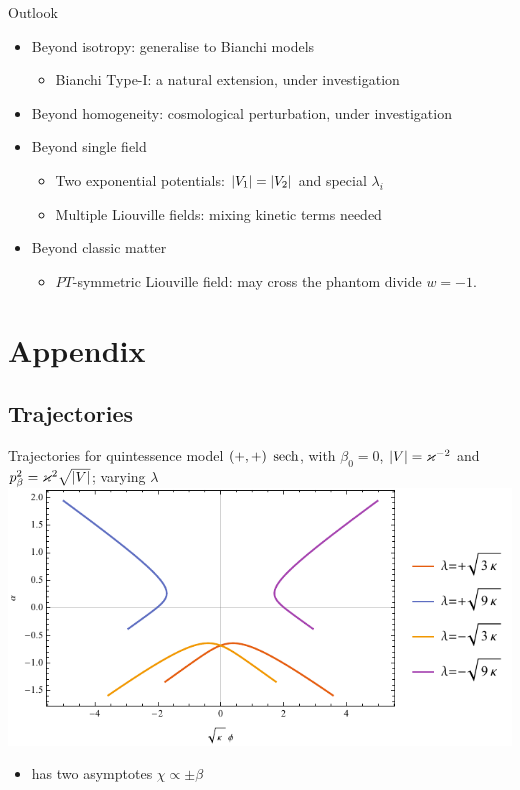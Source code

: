 \documentclass[8pt]{beamer}
\begin{document}
\begin{frame}%
{Outlook}%
\begin{itemize}
\item Beyond isotropy: generalise to Bianchi models
\begin{itemize}
\item Bianchi Type-I: a natural extension, \alert{under investigation}
\end{itemize}

\item Beyond homogeneity: cosmological perturbation,
\alert{under investigation}

\item Beyond single field
\begin{itemize}
\item Two exponential potentials: ${\left|V_1\right|} = {\left|V_2\right|}$ and special 
$\lambda_i$
\item Multiple Liouville fields: mixing kinetic
terms needed
\end{itemize}

\item Beyond classic matter
\begin{itemize}
\item $PT$-symmetric Liouville field: 
may cross the phantom divide $w = -1$.
\end{itemize}

\end{itemize}
\end{frame}


\section*{Appendix}

\subsection*{Trajectories}

\begin{frame}%
{Trajectories for quintessence model ${\left(+,+\right)}$}%
{$\operatorname{sech}$, with $\beta_0 = 0$, ${\left|V\right|} = \varkappa^{-2}$ and
$p_\beta^2 = \varkappa^2\sqrt{{\left|V\right|}}$; varying $\lambda$}
\includegraphics[width=\textwidth]{../plots.nb/sech_lamb.pdf}
\begin{itemize}
	\item has two asymptotes $\chi \propto \pm \beta$
\end{itemize}
\end{frame}
\end{document}
